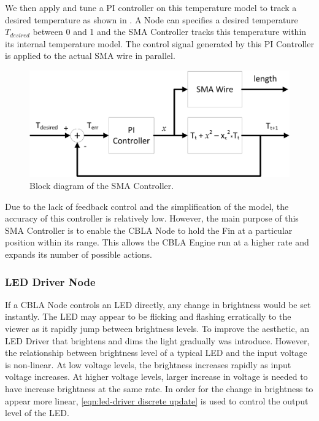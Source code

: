 We then apply and tune a PI controller on this temperature model to track a desired temperature as shown in . A Node can specifies a desired temperature $T_{desired}$ between 0 and 1 and the SMA Controller tracks this temperature within its internal temperature model. The control signal generated by this PI Controller is applied to the actual SMA wire in parallel. 

\begin{figure} [!htbp]
	\centering
	\includegraphics[width=1.0\textwidth]{"fig/validations/SMA Controller"}
	\caption[Block diagram of the SMA Controller]{Block diagram of the SMA Controller. }
	\label{fig:SMA Controller}
\end{figure}

Due to the lack of feedback control and the simplification of the model, the accuracy of this controller is relatively low. However, the main purpose of this SMA Controller is to enable the CBLA Node to hold the Fin at a particular position within its range. This allows the CBLA Engine run at a higher rate and expands its number of possible actions. 


\subsubsection{LED Driver Node}

If a CBLA Node controls an LED directly, any change in brightness would be set instantly. The LED may appear to be flicking and flashing erratically to the viewer as it rapidly jump between brightness levels. To improve the aesthetic, an LED Driver that brightens and dims the light gradually was introduce. However, the relationship between brightness level of a typical LED and the input voltage is non-linear. At low voltage levels, the brightness increases rapidly as input voltage increases. At higher voltage levels, larger increase in voltage is needed to have increase brightness at the same rate. In order for the change in brightness to appear more linear, \eqref{eqn:led-driver discrete update} is used to control the output level of the LED. 

